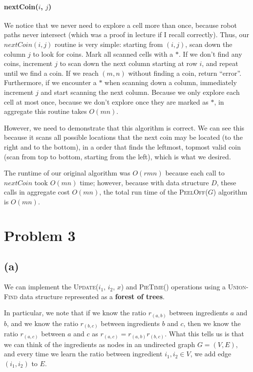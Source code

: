 \documentclass{6046}
\begin{document}
\paragraph{nextCoin($i$, $j$)} We notice that we never
need to explore a cell more than once, because robot paths
never intersect (which was a proof in lecture if I recall correctly).
Thus, our $nextCoin(i, j)$ routine is very simple:
starting from $(i, j)$, scan down the column $j$ to look for coins.
Mark all scanned cells with a $*$. If we don't find any coins, increment
$j$ to scan down the next column starting at row $i$,
and repeat until we find a coin. If we reach $(m, n)$ without
finding a coin, return ``error''. Furthermore, if we encounter
a $*$ when scanning down a column, immediately increment $j$
and start scanning the next column. Because we only explore each
cell at most once, because we don't explore once they are
marked as $*$, in aggregate this routine takes $O(mn)$.

However, we need to demonstrate that this algorithm is correct.
We can see this because it scans all possible locations that
the next coin may be located (to the right and to the bottom),
in a order that finds the leftmost, topmost valid coin (scan from
top to bottom, starting from the left), which is what we desired.

The runtime of our original algorithm was $O(rmn)$ because
each call to $nextCoin$ took $O(mn)$ time; however, because
with data structure $D$, these calls in aggregate cost $O(mn)$,
the total run time of the \textsc{PeelOff($G$)} algorithm is $O(mn)$.

\section*{Problem 3}
\subsection*{(a)}
We can implement the \textsc{Update($i_1$, $i_2$, $x$)} and
\textsc{PieTime()} operations using a \textsc{Union-Find}
data structure represented as a {\bf forest of trees}.

In particular, we note that if we know the ratio $r_{(a,b)}$ between
ingredients $a$ and $b$, and we know the ratio $r_{(b,c)}$ between
ingredients $b$ and $c$, then we know the ratio $r_{(a,c)}$ 
between $a$ and $c$ as $r_{(a,c)} = r_{(a,b)}r_{(b,c)}$. What
this tells us is that we can think of the ingredients as
nodes in an undirected graph $G = (V, E)$, and every time we learn the ratio
between ingredient $i_1, i_2 \in V$, we add edge $(i_1, i_2)$
to $E$.
\end{document}
